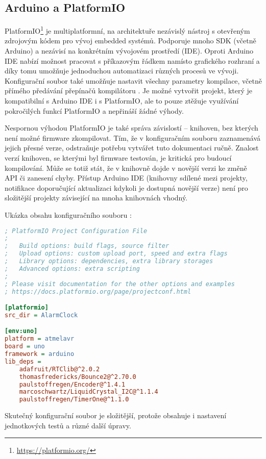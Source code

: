 \subsection{Arduino a PlatformIO}

PlatformIO\footnote{\url{https://platformio.org/}} je multiplatformní, na
architektuře nezávislý nástroj s otevřeným zdrojovým kódem pro vývoj embedded
systémů. Podporuje mnoho SDK (včetně Arduino) a nezávisí na konkrétním
vývojovém prostředí (IDE). Oproti Arduino IDE nabízí možnost pracovat
s příkazovým řádkem namísto grafického rozhraní a díky tomu umožňuje
jednoduchou automatizaci různých procesů ve vývoji. Konfigurační soubor
 také umožňuje nastavit všechny parametry kompilace,
včetně přímého předávání přepínačů kompilátoru . Je možné
vytvořit projekt, který je kompatibilní s Arduino IDE i s PlatformIO, ale to
pouze ztěžuje využívání pokročilých funkcí PlatformIO a nepřináší žádné výhody.

Nespornou výhodou PlatformIO je také správa závislostí -- knihoven, bez kterých
není možné firmware zkompilovat. Tím, že v konfiguračním souboru
 zaznamenává jejich přesné verze, odstraňuje potřebu
vytvářet tuto dokumentaci ručně. Znalost verzí knihoven, se kterými byl
firmware testován, je kritická pro budoucí kompilování. Může se totiž stát, že
v knihovně dojde v novější verzi ke změně API či zanesení chyby. Přístup
Arduino IDE (knihovny sdílené mezi projekty, notifikace doporučující
aktualizaci kdykoli je dostupná novější verze) není pro složitější projekty
závisející na mnoha knihovnách vhodný.

Ukázka obsahu konfiguračního souboru :
\begin{lstlisting}[language=Ini]
; PlatformIO Project Configuration File
;
;   Build options: build flags, source filter
;   Upload options: custom upload port, speed and extra flags
;   Library options: dependencies, extra library storages
;   Advanced options: extra scripting
;
; Please visit documentation for the other options and examples
; https://docs.platformio.org/page/projectconf.html

[platformio]
src_dir = AlarmClock

[env:uno]
platform = atmelavr
board = uno
framework = arduino
lib_deps = 
	adafruit/RTClib@^2.0.2
	thomasfredericks/Bounce2@^2.70.0
	paulstoffregen/Encoder@^1.4.1
	marcoschwartz/LiquidCrystal_I2C@^1.1.4
	paulstoffregen/TimerOne@^1.1.0
\end{lstlisting}
Skutečný konfigurační soubor je složitější, protože obsahuje i nastavení
jednotkových testů a různé další úpravy.

